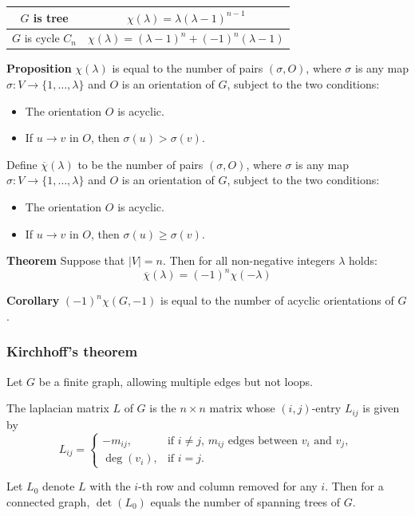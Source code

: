 \begin{tabular}{|c|c|}
\hline
$G$ is tree & $\chi(\lambda) = \lambda(\lambda - 1)^{n - 1}$ \\
\hline
$G$ is cycle $C_n$ & $\chi(\lambda) = (\lambda - 1)^n + (-1)^n(\lambda - 1)$\\
\hline
\end{tabular} 
 
\textbf{Proposition} $\chi(\lambda)$ is equal to the number of pairs $(\sigma, O)$, 
where $\sigma$ is any map $\sigma : V \rightarrow \{1, \dots, \lambda\}$ and $O$ is an orientation of $G$, 
subject to the two conditions:
\begin{itemize}
\item The orientation $O$ is acyclic.
\item If $u \rightarrow v$ in $O$, then $\sigma (u) > \sigma (v)$.
\end{itemize}

Define $\overline{\chi}(\lambda)$ to be the number of pairs $(\sigma, O)$, 
where $\sigma$ is any map $\sigma : V \rightarrow \{1, \dots, \lambda\}$ and $O$ is an orientation of $G$, 
subject to the two conditions:
\begin{itemize}
\item The orientation $O$ is acyclic.
\item If $u \rightarrow v$ in $O$, then $\sigma (u) \ge \sigma (v)$.
\end{itemize}

\textbf{Theorem} Suppose that $|V| = n$. Then for all non-negative integers $\lambda$ holds:
$$\overline{\chi}(\lambda) = (-1)^n \chi(-\lambda)$$

\textbf{Corollary} $(-1)^n \chi(G, -1)$ is equal to the number of acyclic orientations of $G$.

\subsubsection{Kirchhoff's theorem}

Let $G$ be a finite graph, allowing multiple edges but not loops.

The laplacian matrix $L$ of $G$ is the $n \times n$ matrix whose
$(i, j)$-entry $L_{i j}$ is given by
\begin{displaymath}
L_{i j} = \left\{ \begin{array}{ll}
-m_{i j}, & \textrm{if $i \ne j$, $m_{i j}$ edges between $v_i$ and $v_j$, } \\
\deg(v_i), & \textrm{if $i = j$.}
\end{array} \right.
\end{displaymath}

Let $L_0$ denote $L$ with the $i$-th row and column removed for any $i$.
Then for a connected graph, $\det(L_0)$ equals the number of spanning trees of $G$.
